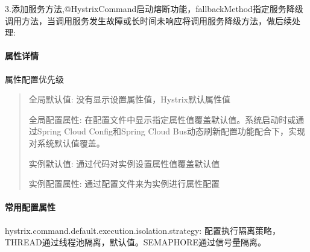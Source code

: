 \documentclass[letterpaper,10pt,english]{sphinxmanual}
\begin{document}
3.添加服务方法,@HystrixCommand启动熔断功能，fallbackMethod指定服务降级调用方法，当调用服务发生故障或长时间未响应将调用服务降级方法，做后续处理:

\begin{sphinxVerbatim}[commandchars=\\\{\}]
  

     

      
      

          


      

         

\end{sphinxVerbatim}


\paragraph{属性详情}
\label{\detokenize{01.spring-cloud/03.feign/hystrix_02:id2}}
属性配置优先级
\begin{quote}

全局默认值: 没有显示设置属性值，Hystrix默认属性值

全局配置属性: 在配置文件中显示指定属性值覆盖默认值。系统启动时或通过Spring Cloud Config和Spring Cloud Bus动态刷新配置功能配合下，实现对系统默认值覆盖。

实例默认值: 通过代码对实例设置属性值覆盖默认值

实例配置属性: 通过配置文件来为实例进行属性配置
\end{quote}


\paragraph{常用配置属性}
\label{\detokenize{01.spring-cloud/03.feign/hystrix_02:id3}}
hystrix.command.default.execution.isolation.strategy: 配置执行隔离策略，THREAD通过线程池隔离，默认值。SEMAPHORE通过信号量隔离。
\end{document}
